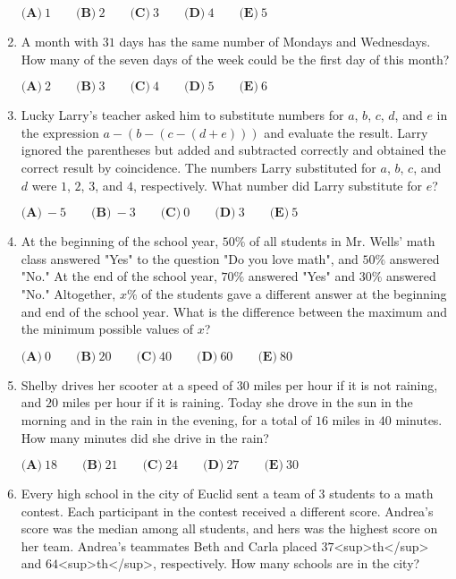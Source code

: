 \documentclass{article}
\begin{document}
\begin{enumerate}[label=\arabic*., itemsep=0.5em]
$\textbf{(A)}\ 1 \qquad \textbf{(B)}\ 2 \qquad \textbf{(C)}\ 3 \qquad \textbf{(D)}\ 4 \qquad \textbf{(E)}\ 5$\par \vspace{0.5em}\item A month with $31$ days has the same number of Mondays and Wednesdays. How many of the seven days of the week could be the first day of this month?

$\textbf{(A)}\ 2 \qquad \textbf{(B)}\ 3 \qquad \textbf{(C)}\ 4 \qquad \textbf{(D)}\ 5 \qquad \textbf{(E)}\ 6$\par \vspace{0.5em}\item Lucky Larry's teacher asked him to substitute numbers for $a$, $b$, $c$, $d$, and $e$ in the expression $a-(b-(c-(d+e)))$ and evaluate the result. Larry ignored the parentheses but added and subtracted correctly and obtained the correct result by coincidence. The numbers Larry substituted for $a$, $b$, $c$, and $d$ were $1$, $2$, $3$, and $4$, respectively. What number did Larry substitute for $e$?

$\textbf{(A)}\ -5 \qquad \textbf{(B)}\ -3 \qquad \textbf{(C)}\ 0 \qquad \textbf{(D)}\ 3 \qquad \textbf{(E)}\ 5$\par \vspace{0.5em}\item At the beginning of the school year, $50\%$ of all students in Mr. Wells' math class answered "Yes" to the question "Do you love math", and $50\%$ answered "No." At the end of the school year, $70\%$ answered "Yes" and $30\%$ answered "No." Altogether, $x\%$ of the students gave a different answer at the beginning and end of the school year. What is the difference between the maximum and the minimum possible values of $x$?

$\textbf{(A)}\ 0 \qquad \textbf{(B)}\ 20 \qquad \textbf{(C)}\ 40 \qquad \textbf{(D)}\ 60 \qquad \textbf{(E)}\ 80$\par \vspace{0.5em}\item Shelby drives her scooter at a speed of $30$ miles per hour if it is not raining, and $20$ miles per hour if it is raining. Today she drove in the sun in the morning and in the rain in the evening, for a total of $16$ miles in $40$ minutes. How many minutes did she drive in the rain?

$\textbf{(A)}\ 18 \qquad \textbf{(B)}\ 21 \qquad \textbf{(C)}\ 24 \qquad \textbf{(D)}\ 27 \qquad \textbf{(E)}\ 30$\par \vspace{0.5em}\item Every high school in the city of Euclid sent a team of $3$ students to a math contest. Each participant in the contest received a different score. Andrea's score was the median among all students, and hers was the highest score on her team. Andrea's teammates Beth and Carla placed $37$<sup>th</sup> and $64$<sup>th</sup>, respectively. How many schools are in the city?


\end{enumerate}
\end{document}
